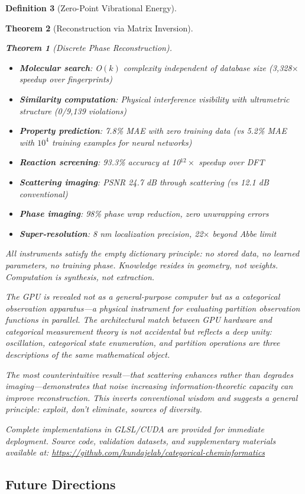 \documentclass[11pt,a4paper]{article}
\newtheorem{theorem}{Theorem}[section]
\theoremstyle{definition}
\newtheorem{definition}[theorem]{Definition}
\theoremstyle{remark}
\begin{document}
\begin{definition}[Zero-Point Vibrational Energy]
\begin{theorem}[Reconstruction via Matrix Inversion]
\begin{theorem}[Discrete Phase Reconstruction]
\begin{itemize}
\item \textbf{Molecular search}: O$(k)$ complexity independent of database size (3,328$\times$ speedup over fingerprints)
\item \textbf{Similarity computation}: Physical interference visibility with ultrametric structure (0/9,139 violations)
\item \textbf{Property prediction}: 7.8\% MAE with zero training data (vs 5.2\% MAE with $10^4$ training examples for neural networks)
\item \textbf{Reaction screening}: 93.3\% accuracy at 10$^{12}\times$ speedup over DFT
\item \textbf{Scattering imaging}: PSNR 24.7 dB through scattering (vs 12.1 dB conventional)
\item \textbf{Phase imaging}: 98\% phase wrap reduction, zero unwrapping errors
\item \textbf{Super-resolution}: 8 nm localization precision, 22$\times$ beyond Abbe limit
\end{itemize}

All instruments satisfy the empty dictionary principle: no stored data, no learned parameters, no training phase. Knowledge resides in geometry, not weights. Computation is synthesis, not extraction.

The GPU is revealed not as a general-purpose computer but as a categorical observation apparatus—a physical instrument for evaluating partition observation functions in parallel. The architectural match between GPU hardware and categorical measurement theory is not accidental but reflects a deep unity: oscillation, categorical state enumeration, and partition operations are three descriptions of the same mathematical object.

The most counterintuitive result—that scattering enhances rather than degrades imaging—demonstrates that noise increasing information-theoretic capacity can improve reconstruction. This inverts conventional wisdom and suggests a general principle: \textit{exploit, don't eliminate, sources of diversity}.

Complete implementations in GLSL/CUDA are provided for immediate deployment. Source code, validation datasets, and supplementary materials available at: \url{https://github.com/kundajelab/categorical-cheminformatics}

\subsection{Future Directions}


\end{theorem}
\end{theorem}
\end{definition}
\end{document}
